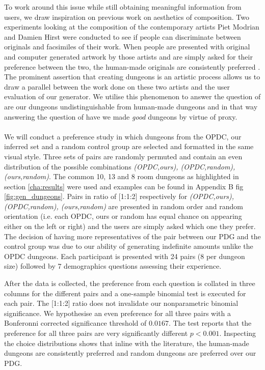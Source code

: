 \documentclass{UoYCSproject}
\begin{document}
To work around this issue while still obtaining meaningful information from users, we draw inspiration on previous work on aesthetics of composition. Two experiments looking at the composition of the contemporary artists Piet Modrian and Damien Hirst were conducted to see if people can discriminate between originals and facsimiles of their work. When people are presented with original and computer generated artwork by those artists and are simply asked for their preference between the two, the human-made originals are consistently preferred \parencite{McManusMondrian, FurnhamMondrian}. The prominent assertion that creating dungeons is an artistic process allows us to draw a parallel between the work done on these two artists and the user evaluation of our generator. We utilise this phenomenon to answer the question of are our dungeons undistinguishable from human-made dungeons and in that way answering the question of have we made \textit{good} dungeons by virtue of proxy.

\paragraph{}
We will conduct a preference study in which dungeons from the OPDC, our inferred set and a random control group are selected and formatted in the same visual style. Three sets of pairs are randomly permuted and contain an even distribution of the possible combinations \textit{(OPDC,ours), (OPDC,random), (ours,random)}.
The common 10, 13 and 8 room dungeons as highlighted in section \ref{cha:results} were used and examples can be found in Appendix B fig \ref{fig:gen_dungeons}. Pairs in ratio of [1:1:2] respectively for \textit{(OPDC,ours), (OPDC,random), (ours,random)} are presented in random order and random orientation (i.e. each OPDC, ours or random has equal chance on appearing either on the left or right) and the users are simply asked which one they prefer. The decision of having more representatives of the pair between our PDG and the control group was due to our ability of generating indefinite amounts unlike the OPDC dungeons. Each participant is presented with 24 pairs (8 per dungeon size) followed by 7 demographics questions assessing their experience. 

After the data is collected, the preference from each question is collated in three columns for the different pairs and a one-sample binomial test is executed for each pair. The [1:1:2] ratio does not invalidate our nonparametric binomial significance. We hypothesise an even preference for all three pairs with a Bonferonni corrected significance threshold of \(0.0167\). The test reports that the preference for all three pairs are very significantly different \(p < 0.001\). Inspecting the choice distributions shows that inline with the literature, the human-made dungeons are consistently preferred and random dungeons are preferred over our PDG.
\end{document}
